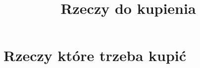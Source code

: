 \documentclass[a4paper,11pt]{article}
\title{Rzeczy do kupienia}
\begin{document}





\maketitle  %





\section{Rzeczy które trzeba kupić}

\vspace{\spaceTwo}
\end{document}
